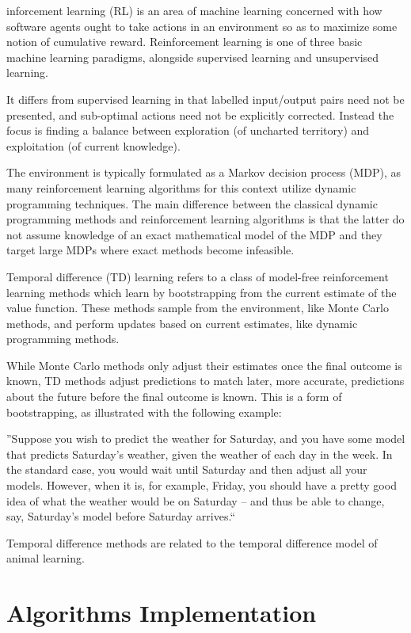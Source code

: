 \documentclass[journal]{IEEEtran}
\begin{document}
inforcement learning (RL) is an area of machine learning concerned with how software agents ought to take actions in an environment so as to maximize some notion of cumulative reward. Reinforcement learning is one of three basic machine learning paradigms, alongside supervised learning and unsupervised learning.

It differs from supervised learning in that labelled input/output pairs need not be presented, and sub-optimal actions need not be explicitly corrected. Instead the focus is finding a balance between exploration (of uncharted territory) and exploitation (of current knowledge).

The environment is typically formulated as a Markov decision process (MDP), as many reinforcement learning algorithms for this context utilize dynamic programming techniques. The main difference between the classical dynamic programming methods and reinforcement learning algorithms is that the latter do not assume knowledge of an exact mathematical model of the MDP and they target large MDPs where exact methods become infeasible.

Temporal difference (TD) learning refers to a class of model-free reinforcement learning methods which learn by bootstrapping from the current estimate of the value function. These methods sample from the environment, like Monte Carlo methods, and perform updates based on current estimates, like dynamic programming methods.

While Monte Carlo methods only adjust their estimates once the final outcome is known, TD methods adjust predictions to match later, more accurate, predictions about the future before the final outcome is known. This is a form of bootstrapping, as illustrated with the following example:

''Suppose you wish to predict the weather for Saturday, and you have some model that predicts Saturday's weather, given the weather of each day in the week. In the standard case, you would wait until Saturday and then adjust all your models. However, when it is, for example, Friday, you should have a pretty good idea of what the weather would be on Saturday – and thus be able to change, say, Saturday's model before Saturday arrives.``

Temporal difference methods are related to the temporal difference model of animal learning.

\section{Algorithms Implementation}
\end{document}
